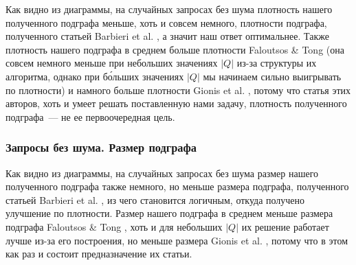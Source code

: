 Как видно из диаграммы, на случайных запросах без шума плотность нашего полученного подграфа меньше, хоть и совсем немного, плотности подграфа, полученного статьей Barbieri et al. \cite{Barbieri15}, а значит наш ответ оптимальнее. Также плотность нашего подграфа в среднем больше плотности Faloutsos \& Tong \cite{Faloutsos06} (она совсем немного меньше при небольших значениях $|Q|$ из-за структуры их алгоритма, однако при б\'{о}льших значениях $|Q|$ мы начинаем сильно выигрывать по плотности) и намного больше плотности Gionis et al. \cite{Gionis15}, потому что статья этих авторов, хоть и умеет решать поставленную нами задачу, плотность полученного подграфа~--- не ее первоочередная цель.

\subsubsection{Запросы без шума. Размер подграфа}

  \begin{center}
  \end{center}

Как видно из диаграммы, на случайных запросах без шума размер нашего полученного подграфа также немного, но меньше размера подграфа, полученного статьей Barbieri et al. \cite{Barbieri15}, из чего становится логичным, откуда получено улучшение по плотности. Размер нашего подграфа в среднем меньше размера подграфа Faloutsos \& Tong \cite{Faloutsos06}, хоть и для небольших $|Q|$ их решение работает лучше из-за его построения, но меньше размера Gionis et al. \cite{Gionis15}, потому что в этом как раз и состоит предназначение их статьи.

